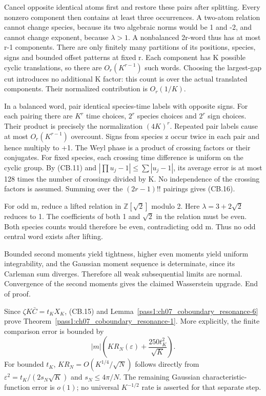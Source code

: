 Cancel opposite identical atoms first and restore these pairs after splitting. Every nonzero component then contains at least three occurrences. A two-atom relation cannot change species, because its two algebraic norms would be 1 and -2, and cannot change exponent, because \(\lambda>1\). A nonbalanced 2r-word thus has at most r-1 components. There are only finitely many partitions of its positions, species, signs and bounded offset patterns at fixed r. Each component has K possible cyclic translations, so there are \(O_r(K^{r-1})\) such words. Choosing the largest-gap cut introduces no additional K factor: this count is over the actual translated components. Their normalized contribution is \(O_r(1/K)\).

In a balanced word, pair identical species-time labels with opposite signs. For each pairing there are \(K^r\) time choices, \(2^r\) species choices and \(2^r\) sign choices. Their product is precisely the normalization \((4K)^r\). Repeated pair labels cause at most \(O_r(K^{r-1})\) overcount. Signs from species z occur twice in each pair and hence multiply to +1. The Weyl phase is a product of crossing factors or their conjugates. For fixed species, each crossing time difference is uniform on the cyclic group. By (CB.11) and \(|\prod u_j-1|\leq\sum|u_j-1|\), its average error is at most 128 times the number of crossings divided by K. No independence of the crossing factors is assumed. Summing over the \((2r-1)!!\) pairings gives (CB.16).

For odd m, reduce a lifted relation in \(\mathbb Z[\sqrt2]\) modulo 2. Here \(\lambda=3+2\sqrt2\) reduces to 1. The coefficients of both 1 and \(\sqrt2\) in the relation must be even. Both species counts would therefore be even, contradicting odd m. Thus no odd central word exists after lifting.

Bounded second moments yield tightness, higher even moments yield uniform integrability, and the Gaussian moment sequence is determinate, since its Carleman sum diverges. Therefore all weak subsequential limits are normal. Convergence of the second moments gives the claimed Wasserstein upgrade. End of proof.

Since \(\zeta K\bar C=t_KX_K\), (CB.15) and Lemma~\ref{pass1:ch07_coboundary_resonance-6} prove Theorem~\ref{pass1:ch07_coboundary_resonance-1}. More explicitly, the finite comparison error is bounded by \[
 |m|\left(KR_N(\varepsilon)+\frac{250t_K^2}{\sqrt K}\right).    \tag{CB.18}
\] For bounded \(t_{K}\), \(KR_N=O(K^{1/4}/\sqrt N)\) follows directly from \(\varepsilon^2=t_K/(2s_N\sqrt K)\) and \(s_N\leq4\pi/N\). The remaining Gaussian characteristic-function error is \(o(1)\); no universal \(K^{-1/2}\) rate is asserted for that separate step.

